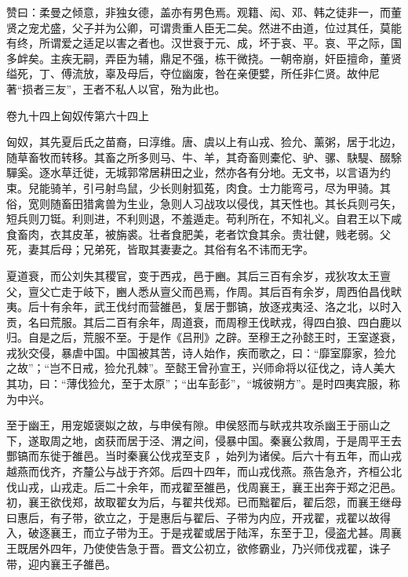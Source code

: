\documentclass[12pt,UTF8]{ctexbook}
\begin{document}
赞曰：柔曼之倾意，非独女德，盖亦有男色焉。观籍、闳、邓、韩之徒非一，而董贤之宠尤盛，父子并为公卿，可谓贵重人臣无二矣。然进不由道，位过其任，莫能有终，所谓爱之适足以害之者也。汉世衰于元、成，坏于哀、平。哀、平之际，国多衅矣。主疾无嗣，弄臣为辅，鼎足不强，栋干微挠。一朝帝崩，奸臣擅命，董贤缢死，丁、傅流放，辜及母后，夺位幽废，咎在亲便嬖，所任非仁贤。故仲尼著“损者三友”，王者不私人以官，殆为此也。





卷九十四上匈奴传第六十四上



匈奴，其先夏后氏之苗裔，曰淳维。唐、虞以上有山戎、猃允、薰粥，居于北边，随草畜牧而转移。其畜之所多则马、牛、羊，其奇畜则橐佗、驴、骡、駃騠、醊駼驒奚。逐水草迁徙，无城郭常居耕田之业，然亦各有分地。无文书，以言语为约束。兒能骑羊，引弓射鸟鼠，少长则射狐菟，肉食。士力能弯弓，尽为甲骑。其俗，宽则随畜田猎禽兽为生业，急则人习战攻以侵伐，其天性也。其长兵则弓矢，短兵则刀铤。利则进，不利则退，不羞遁走。苟利所在，不知礼义。自君王以下咸食畜肉，衣其皮革，被旃裘。壮者食肥美，老者饮食其余。贵壮健，贱老弱。父死，妻其后母；兄弟死，皆取其妻妻之。其俗有名不讳而无字。



夏道衰，而公刘失其稷官，变于西戎，邑于豳。其后三百有余岁，戎狄攻太王亶父，亶父亡走于岐下，豳人悉从亶父而邑焉，作周。其后百有余岁，周西伯昌伐畎夷。后十有余年，武王伐纣而营雒邑，复居于酆镐，放逐戎夷泾、洛之北，以时入贡，名曰荒服。其后二百有余年，周道衰，而周穆王伐畎戎，得四白狼、四白鹿以归。自是之后，荒服不至。于是作《吕刑》之辟。至穆王之孙懿王时，王室遂衰，戎狄交侵，暴虐中国。中国被其苦，诗人始作，疾而歌之，曰：“靡室靡家，猃允之故”；“岂不日戒，猃允孔棘”。至懿王曾孙宣王，兴师命将以征伐之，诗人美大其功，曰：“薄伐猃允，至于太原”；“出车彭彭”，“城彼朔方”。是时四夷宾服，称为中兴。



至于幽王，用宠姬褒姒之故，与申侯有隙。申侯怒而与畎戎共攻杀幽王于丽山之下，遂取周之地，卤获而居于泾、渭之间，侵暴中国。秦襄公救周，于是周平王去酆镐而东徙于雒邑。当时秦襄公伐戎至支阝，始列为诸侯。后六十有五年，而山戎越燕而伐齐，齐釐公与战于齐郊。后四十四年，而山戎伐燕。燕告急齐，齐桓公北伐山戎，山戎走。后二十余年，而戎翟至雒邑，伐周襄王，襄王出奔于郑之汜邑。初，襄王欲伐郑，故取翟女为后，与翟共伐郑。已而黜翟后，翟后怨，而襄王继母曰惠后，有子带，欲立之，于是惠后与翟后、子带为内应，开戎翟，戎翟以故得入，破逐襄王，而立子带为王。于是戎翟或居于陆浑，东至于卫，侵盗尤甚。周襄王既居外四年，乃使使告急于晋。晋文公初立，欲修霸业，乃兴师伐戎翟，诛子带，迎内襄王子雒邑。
\end{document}
